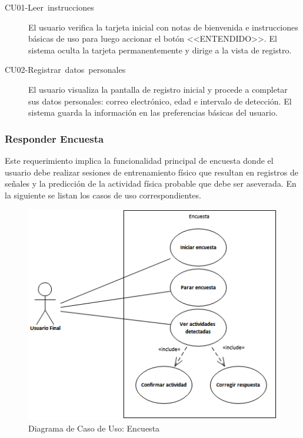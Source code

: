 \begin{description}
\item [{CU01-Leer~instrucciones}] El usuario verifica la tarjeta inicial
con notas de bienvenida e instrucciones básicas de uso para luego
accionar el botón <<ENTENDIDO>>. El sistema oculta la tarjeta permanentemente
y dirige a la vista de registro.
\item [{CU02-Registrar~datos~personales}] El usuario visualiza la pantalla
de registro inicial y procede a completar sus datos personales: correo
electrónico, edad e intervalo de detección. El sistema guarda la información
en las preferencias básicas del usuario.
\end{description}

\subsubsection{Responder Encuesta}

Este requerimiento implica la funcionalidad principal de encuesta
donde el usuario debe realizar sesiones de entrenamiento físico que
resultan en registros de señales y la predicción de la actividad física
probable que debe ser aseverada. En la siguiente 
se listan los casos de uso correspondientes.

\begin{figure}[H]
\begin{centering}
\includegraphics{capitulo-5/graphics/caso_encuesta}
\par\end{centering}
\caption[Diagrama de Caso de Uso: Encuesta]{\label{fig5:uc-encuesta}Diagrama de Caso de Uso: Encuesta}

\end{figure}

